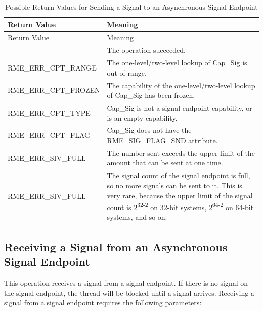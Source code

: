 \begin{xltabular}{\textwidth}{@{}>{\hsize\raggedright\arraybackslash}X>{\hsize\raggedright\arraybackslash}X@{}}
\caption{Possible Return Values for Sending a Signal to an Asynchronous Signal Endpoint}\label{tab:5-21-send-signal-return-values}\\
\toprule
Return Value & Meaning\tabularnewline
\endfirsthead
\toprule
Return Value & Meaning\tabularnewline
\midrule
\endhead
\bottomrule
{} & The operation succeeded.\tabularnewline
    RME\_ERR\_CPT\_RANGE & The one-level/two-level lookup of Cap\_Sig is out of range.\tabularnewline
    RME\_ERR\_CPT\_FROZEN & The capability of the one-level/two-level lookup of Cap\_Sig has been frozen.\tabularnewline
    RME\_ERR\_CPT\_TYPE & Cap\_Sig is not a signal endpoint capability, or is an empty capability.\tabularnewline
    RME\_ERR\_CPT\_FLAG & Cap\_Sig does not have the RME\_SIG\_FLAG\_SND attribute.\tabularnewline
    RME\_ERR\_SIV\_FULL & The number sent exceeds the upper limit of the amount that can be sent at one time.\tabularnewline
    RME\_ERR\_SIV\_FULL & The signal count of the signal endpoint is full, so no more signals can be sent to it. This is very rare, because the upper limit of the signal count is 2\textsuperscript{32-2} on 32-bit systems, 2\textsuperscript{64-2} on 64-bit systems, and so on.\tabularnewline
\end{xltabular}
\nopagebreak[4]

\subsection{Receiving a Signal from an Asynchronous Signal Endpoint}\label{subsec:5-receive-signal-from-signal-endpoint}

This operation receives a signal from a signal endpoint. If there is no signal on the signal endpoint, the thread will be blocked until a signal arrives. Receiving a signal from a signal endpoint requires the following parameters:

